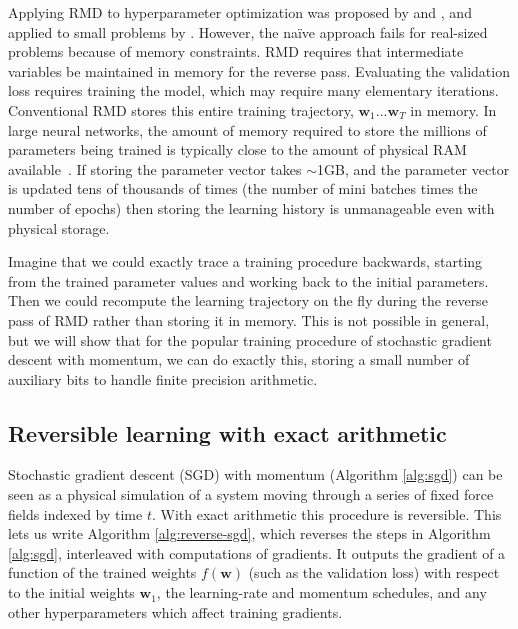 \documentclass{article}
\newcommand{\vw}{\mathbf{w}}
\newcommand{\primal}{elementary}
\newcommand{\params}{\vw}
\begin{document}
Applying RMD to hyperparameter optimization was proposed by \citet{bengio2000gradient} and \citet{Autodiff14}, and applied to small problems by \citet{domke2012generic}.
However, the na\"ive approach fails for real-sized problems because
of memory constraints. RMD requires that intermediate variables be maintained
in memory for the reverse pass. Evaluating the validation loss
requires training the model, which may require many \primal{} iterations. Conventional
RMD stores this entire training trajectory, $\params_1
... \params_T$ in memory.  In large neural networks, the amount of
memory required to store the millions of parameters being trained is typically
close to the amount of physical RAM available~\cite{sequence2014}. If storing
the parameter vector takes $\sim$1GB, and the parameter vector is updated tens
of thousands of times (the number of mini batches times the number of
epochs) then storing the learning history is unmanageable even with
physical storage.

Imagine that we could exactly trace a training
procedure backwards, starting from the trained parameter values and working
back to the initial parameters. Then we could recompute the learning trajectory
on the fly during the reverse pass of RMD rather than storing it in memory. This is
not possible in general, but we will show that for the popular training
procedure of stochastic gradient descent with momentum, we can do
exactly this, storing a small number of auxiliary bits to handle
finite precision arithmetic.

\subsection{Reversible learning with exact arithmetic}
\label{sec:reversible learning}

Stochastic gradient descent (SGD) with momentum (Algorithm \ref{alg:sgd}) can be
seen as a physical simulation of a system moving through a series of fixed force
fields indexed by time $t$. With exact arithmetic this procedure is reversible. This lets us write Algorithm \ref{alg:reverse-sgd}, which reverses the steps in Algorithm
\ref{alg:sgd}, interleaved with computations of gradients. It outputs the
gradient of a function of the trained weights $f(\params)$ (such as the validation
loss) with respect to the initial weights $\params_1$, the learning-rate and momentum
schedules, and any other hyperparameters which affect training gradients.
\end{document}
